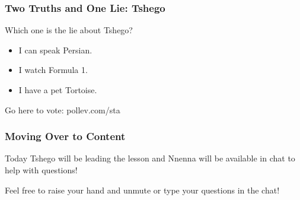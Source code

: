 \documentclass{beamer}
\begin{document}

\begin{frame}
\frametitle{\textbf{Two Truths and One Lie:} Tshego}

Which one is the lie about Tshego?
\begin{itemize}
	\item I can speak Persian.
	\item I watch Formula 1.
	\item I have a pet Tortoise.
\end{itemize}

 \vspace{0.5cm}

Go here to vote: pollev.com/sta

\end{frame}



\begin{frame}
\frametitle{\textbf{Moving Over to Content}}

Today Tshego will be leading the lesson and Nnenna will be available in chat to help with questions!  \vspace{0.5cm}

Feel free to raise your hand and unmute or type your questions in the chat!

\end{frame}


\end{document}
